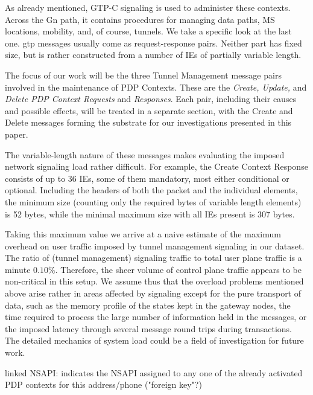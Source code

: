 As already mentioned, GTP-C signaling is used to administer these contexts. Across the Gn path, it contains procedures for managing data paths, \gls{MS} locations, mobility, and, of course, tunnels. We take a specific look at the last one. \gls{gtp} messages usually come as request-response pairs. Neither part has fixed size, but is rather constructed from a number of \glspl{IE} of partially variable length. 

The focus of our work will be the three Tunnel Management message pairs involved in the maintenance of PDP Contexts. These are the \textit{Create, Update,} and \textit{Delete PDP Context Requests} and \textit{Responses}. Each pair, including their causes and possible effects, will be treated in a separate section, with the Create and Delete messages forming the substrate for our investigations presented in this paper.

The variable-length nature of these messages makes evaluating the imposed network signaling load rather difficult. For example, the Create Context Response consists of up to 36 \glspl{IE}, some of them mandatory, most either conditional or optional. Including the headers of both the packet and the individual elements, the minimum size (counting only the required bytes of variable length elements) is 52 bytes, while the minimal maximum size with all \glspl{IE} present is 307 bytes.

Taking this maximum value we arrive at a naive estimate of the maximum overhead on user traffic imposed by tunnel management signaling in our dataset. The ratio of (tunnel management) signaling traffic to total user plane traffic is a minute $0.10\%$. Therefore, the sheer volume of control plane traffic appears to be non-critical in this setup. We assume thus that the overload problems mentioned above arise rather in areas affected by signaling except for the pure transport of data, such as the memory profile of the states kept in the gateway nodes, the time required to process the large number of information held in the messages, or the imposed latency through several message round trips during transactions. The detailed mechanics of system load could be a field of investigation for future work.



linked \gls{NSAPI}: indicates the \gls{NSAPI} assigned to any one of the already activated \gls{PDP} contexts for this address/phone ("foreign key"?)

